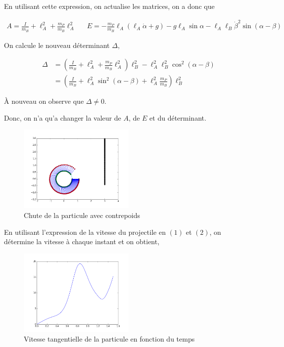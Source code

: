 \documentclass[10pt]{article}
\begin{document}
En utilisant cette expression, on actualise les matrices, on a donc que

\begin{align*}
 A = \frac{I}{m_B}+\ell_A^2+\frac{m_P}{m_B}\ell_A^2 && E = -\frac{m_P}{m_B}\ell_A\left(\ell_A\dot{\alpha} + g\right)-g\ell_A\sin{\alpha}-\ell_A\ell_B\dot{\beta}^2\sin{(\alpha-\beta)}
\end{align*}


On calcule le nouveau déterminant $\Delta$,

\begin{align*}
 \Delta &= \left(\frac{I}{m_B}+\ell_A^2+\frac{m_P}{m_B}\ell_A^2\right)\ell_B^2 -\ell_A^2\ell_B^2\cos^2{(\alpha-\beta)} \\
	&= \left(\frac{I}{m_B}+\ell_A^2\sin^2{(\alpha-\beta)}+\ell_A^2\frac{m_P}{m_B}\right)\ell_B^2
\end{align*}

À nouveau on observe que $\Delta \neq 0$.

Donc, on n'a qu'a changer la valeur de $A$, de $E$ et du déterminant.

\begin{figure}[h]
\centering
 \includegraphics[width=0.5\textwidth]{../fig/fig3.png}
\caption{Chute de la particule avec contrepoids}
\end{figure}
En utilisant l'expression de la vitesse du projectile en $(1)$ et $(2)$, on détermine la vitesse à chaque instant et on obtient,

\begin{figure}[h!]
\centering
  \includegraphics[width=0.5\textwidth]{../fig/fig4.png}
  \caption{Vitesse tangentielle de la particule en fonction du temps}
\end{figure}
\end{document}
